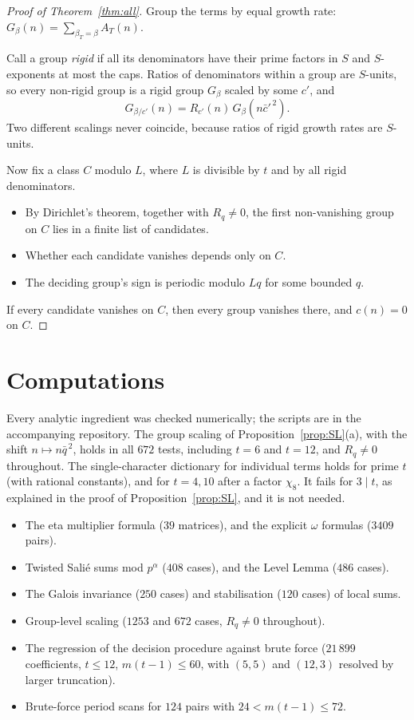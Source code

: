 \documentclass[11pt]{amsart}
\begin{document}
\begin{proof}[Proof of Theorem~\ref{thm:all}]
Group the terms by equal growth rate: $G_\beta(n)=\sum_{\beta_T=\beta}A_T(n)$.

Call a group \emph{rigid} if all its denominators have their prime factors in $S$ and $S$-exponents at most the caps. Ratios of denominators within a group are $S$-units, so every non-rigid group is a rigid group $G_\beta$ scaled by some $c'$, and
\[
G_{\beta/c'}(n)=R_{c'}(n)\,G_\beta(n\bar c'^{\,2}).
\]
Two different scalings never coincide, because ratios of rigid growth rates are $S$-units.

Now fix a class $C$ modulo $L$, where $L$ is divisible by $t$ and by all rigid denominators.
\begin{itemize}[leftmargin=1.5em]
\item By Dirichlet's theorem, together with $R_q\neq0$, the first non-vanishing group on $C$ lies in a finite list of candidates.
\item Whether each candidate vanishes depends only on $C$.
\item The deciding group's sign is periodic modulo $Lq$ for some bounded $q$.
\end{itemize}
If every candidate vanishes on $C$, then every group vanishes there, and $c(n)=0$ on $C$.
\end{proof}

\section{Computations}
Every analytic ingredient was checked numerically; the scripts are in the accompanying repository. The group scaling of Proposition~\ref{prop:SL}(a), with the shift $n\mapsto n\bar q^{\,2}$, holds in all $672$ tests, including $t=6$ and $t=12$, and $R_q\neq0$ throughout. The single-character dictionary for individual terms holds for prime $t$ (with rational constants), and for $t=4,10$ after a factor $\chi_8$. It fails for $3\mid t$, as explained in the proof of Proposition~\ref{prop:SL}, and it is not needed.
\begin{itemize}[leftmargin=1.5em]
\item The eta multiplier formula ($39$ matrices), and the explicit $\omega$ formulas ($3409$ pairs).
\item Twisted Sali\'e sums mod $p^\alpha$ ($408$ cases), and the Level Lemma ($486$ cases).
\item The Galois invariance ($250$ cases) and stabilisation ($120$ cases) of local sums.
\item Group-level scaling ($1253$ and $672$ cases, $R_q\neq0$ throughout).
\item The regression of the decision procedure against brute force ($21\,899$ coefficients, $t\le12$, $m(t-1)\le60$, with $(5,5)$ and $(12,3)$ resolved by larger truncation).
\item Brute-force period scans for $124$ pairs with $24<m(t-1)\le72$.
\end{itemize}
\end{document}

